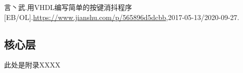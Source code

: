 \documentclass[12pt,AutoFakeBold]{article}
\begin{document}

 \begin{thebibliography}{9}
     言丶武.用VHDL编写简单的按键消抖程序[EB/OL].\url{https://www.jianshu.com/p/565896d5dcbb},2017-05-13/2020-09-27.

 \end{thebibliography}
\newpage
\begin{appendices}  %

\section{核心层}\label{subsec:B}
% 
此处是附录XXXX
       
    \end{appendices}
\end{document}

